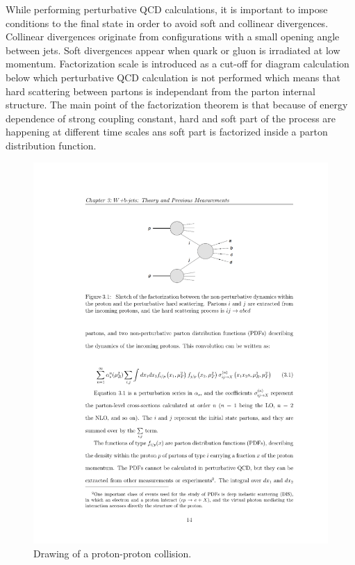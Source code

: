 While performing perturbative QCD calculations, it is important to impose conditions to the final state in order to avoid soft and collinear divergences. Collinear divergences originate from configurations with a small opening angle between jets. Soft divergences appear when quark or gluon is irradiated at low momentum. Factorization scale is introduced as a cut-off for diagram calculation below which perturbative QCD calculation is not performed which means that hard scattering between partons is independant from the parton internal structure. The main point of the factorization theorem  is that because of energy dependence of strong coupling constant, hard and soft part of the process are happening at different time scales ans soft part is factorized inside a parton distribution function.
\begin{figure}[htbp]
	\centering
		\includegraphics{Figures/diagram.pdf}
	\caption[Drawing of a proton-proton collision]{Drawing of a proton-proton collision.}
	\label{fig:pp_drawing}
\end{figure}
